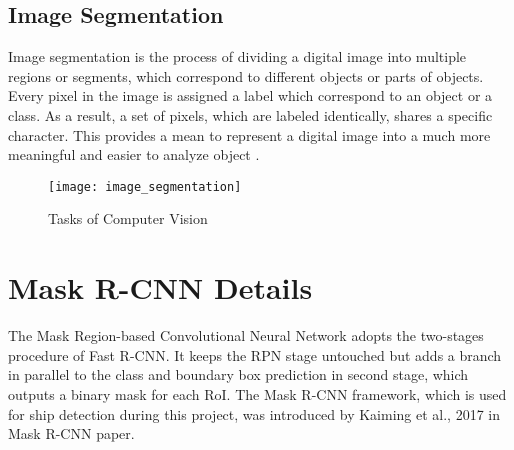 \subsection{Image Segmentation}
\label{subsec:imagesegmentation}
\noindent
Image segmentation is the process of dividing a digital image into multiple regions or segments, which correspond to different objects or parts of objects. Every pixel in the image is assigned a label which correspond to an object or a class. As a result, a set of pixels, which are labeled identically, shares a specific character. This provides a mean to represent a digital image into a much more meaningful and easier to analyze object \cite{kale2010computer}. 

\begin{figure}[t]
  \centering
  \texttt{[image: image\_segmentation]}
  \caption[Image Segmentation]
   {Tasks of Computer Vision  \cite{imgseg}}
   \label{fig:faster-rcnn}
\end{figure}


\section{Mask R-CNN Details}
\label{sec:maskrcnn-details}

The Mask Region-based Convolutional Neural Network adopts the two-stages procedure of Fast R-CNN. It keeps the RPN stage untouched but adds a branch in parallel to the class and boundary box prediction in second stage, which outputs a binary mask for each RoI\cite{HeGDG17}. The Mask R-CNN framework, which is used for ship detection during this project, was introduced by Kaiming et al., 2017 in Mask R-CNN paper.

